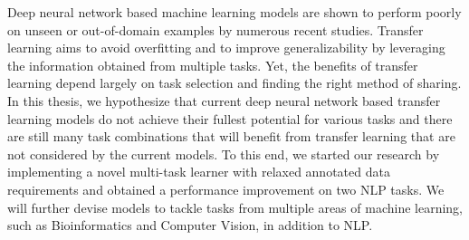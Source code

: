 Deep neural network based machine learning models are shown to perform poorly on unseen or out-of-domain examples by numerous recent studies. Transfer learning aims to avoid overfitting and to improve generalizability by leveraging the information obtained from multiple tasks. Yet, the benefits of transfer learning depend largely on task selection and finding the right method of sharing. In this thesis, we hypothesize that current deep neural network based transfer learning models do not achieve their fullest potential for various tasks and there are still many task combinations that will benefit from transfer learning that are not considered by the current models.  To this end, we started our research by implementing a novel multi-task learner with relaxed annotated data requirements and obtained a performance improvement on two NLP tasks. We will further devise models to tackle tasks from multiple areas of machine learning, such as Bioinformatics and Computer Vision, in addition to NLP.
